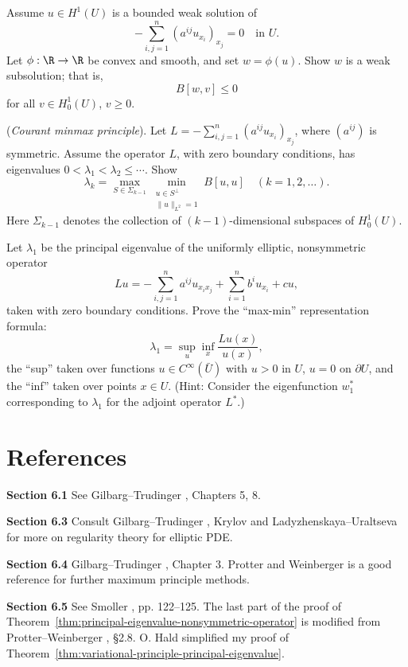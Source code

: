 \begin{exercise}
Assume $u \in H^1(U)$ is a bounded weak solution of
$$-\sum_{i,j=1}^n (a^{ij}u_{x_i})_{x_j} = 0 \quad \text{in } U.$$
Let $\phi : \R \to \R$ be convex and smooth, and set $w = \phi(u)$. Show $w$ is a weak subsolution; that is,
$$B[w,v] \leq 0$$
for all $v \in H_0^1(U)$, $v \geq 0$.
\end{exercise}

\begin{exercise}
(\textit{Courant minmax principle}). Let $L = -\sum_{i,j=1}^n (a^{ij}u_{x_i})_{x_j}$, where $(a^{ij})$ is symmetric. Assume the operator $L$, with zero boundary conditions, has eigenvalues $0 < \lambda_1 < \lambda_2 \leq \cdots$. Show
$$\lambda_k = \max_{S \in \Sigma_{k-1}} \min_{\substack{u \in S^\perp \\ \|u\|_{L^2}=1}} B[u,u] \quad (k=1,2,\ldots).$$
Here $\Sigma_{k-1}$ denotes the collection of $(k-1)$-dimensional subspaces of $H_0^1(U)$.
\end{exercise}

\begin{exercise}
Let $\lambda_1$ be the principal eigenvalue of the uniformly elliptic, nonsymmetric operator
$$Lu = -\sum_{i,j=1}^n a^{ij}u_{x_ix_j} + \sum_{i=1}^n b^iu_{x_i} + cu,$$
taken with zero boundary conditions. Prove the ``max-min'' representation formula:
$$\lambda_1 = \sup_u \inf_x \frac{Lu(x)}{u(x)},$$
the ``sup'' taken over functions $u \in C^\infty(\bar U)$ with $u > 0$ in $U$, $u = 0$ on $\partial U$, and the ``inf'' taken over points $x \in U$. (Hint: Consider the eigenfunction $w_1^*$ corresponding to $\lambda_1$ for the adjoint operator $L^*$.)
\end{exercise}

\section{References}
\label{sec:elliptic-references}

\textbf{Section 6.1} See Gilbarg--Trudinger \cite{GilbargTrudinger1983}, Chapters 5, 8.

\textbf{Section 6.3} Consult Gilbarg--Trudinger \cite{GilbargTrudinger1983}, Krylov \cite{Krylov1996} and Ladyzhenskaya--Uraltseva \cite{LadyzhenskayaUraltseva1968} for more on regularity theory for elliptic PDE.

\textbf{Section 6.4} Gilbarg--Trudinger \cite{GilbargTrudinger1983}, Chapter 3. Protter and Weinberger \cite{ProtterWeinberger1967} is a good reference for further maximum principle methods.

\textbf{Section 6.5} See Smoller \cite{Smoller1983}, pp. 122--125. The last part of the proof of Theorem~\ref{thm:principal-eigenvalue-nonsymmetric-operator} is modified from Protter--Weinberger \cite{ProtterWeinberger1967}, \S2.8. O. Hald simplified my proof of Theorem~\ref{thm:variational-principle-principal-eigenvalue}.
